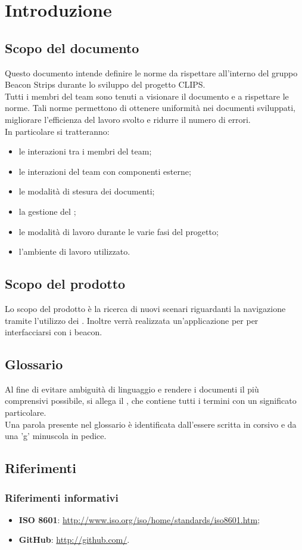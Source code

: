 \section{Introduzione}
	\subsection{Scopo del documento}
	Questo documento intende definire le norme da rispettare all'interno del gruppo Beacon Strips durante lo sviluppo del progetto CLIPS. \\
	Tutti i membri del team sono tenuti a visionare il documento e a rispettare le norme. Tali norme permettono di ottenere uniformità nei documenti sviluppati,
	migliorare l'efficienza del lavoro svolto e ridurre il numero di errori. \\
	In particolare si tratteranno:
	\begin{itemize}
		\item le interazioni tra i membri del team;
		\item le interazioni del team con componenti esterne;
		\item le modalità di stesura dei documenti;
		\item la gestione del ;
		\item le modalità di lavoro durante le varie fasi del progetto;
		\item l'ambiente di lavoro utilizzato.
	\end{itemize}
	
	\subsection{Scopo del prodotto}
	Lo scopo del prodotto è la ricerca di nuovi scenari riguardanti la navigazione tramite l'utilizzo dei . Inoltre verrà realizzata un'applicazione per  per interfacciarsi con i beacon.
	\subsection{Glossario}
	Al fine di evitare ambiguità di linguaggio e rendere i documenti il più comprensivi possibile, si allega il \Gldoc, che contiene tutti i termini con un significato particolare. \\
	Una parola presente nel glossario è identificata dall'essere scritta in corsivo e da una 'g'  minuscola in pedice. %
	\subsection{Riferimenti}
		\subsubsection{Riferimenti informativi}
		\begin{itemize}
			\item \textbf{ISO 8601}: \url{http://www.iso.org/iso/home/standards/iso8601.htm};
			\item \textbf{GitHub}: \url{http://github.com/}.
		\end{itemize}
	
